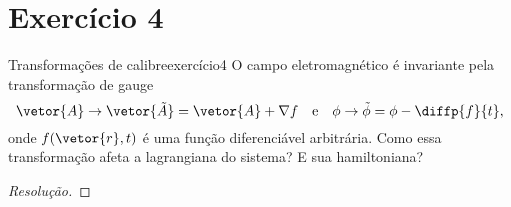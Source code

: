 \section*{Exercício 4}
\begin{exercício}{Transformações de calibre}{exercício4}
    O campo eletromagnético é invariante pela transformação de gauge
    \begin{equation*}
        \vetor{A} \to \vetor{\tilde{A}} = \vetor{A} + \nabla f\quad\text{e}\quad\phi \to \tilde\phi = \phi - \diffp{f}{t},
    \end{equation*}
    onde \(f(\vetor{r}, t)\) é uma função diferenciável arbitrária. Como essa transformação afeta a lagrangiana do sistema? E sua hamiltoniana?
\end{exercício}
\begin{proof}[Resolução]

\end{proof}
